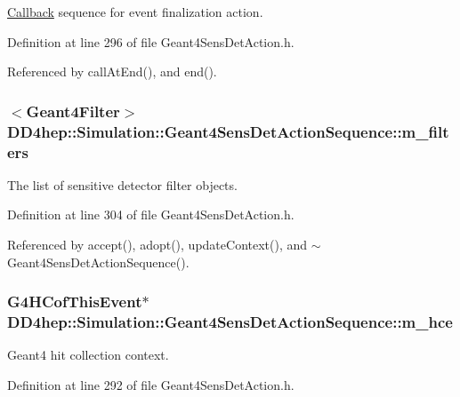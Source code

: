 \hyperlink{class_d_d4hep_1_1_callback}{Callback} sequence for event finalization action. 

Definition at line 296 of file Geant4SensDetAction.h.

Referenced by callAtEnd(), and end().\hypertarget{class_d_d4hep_1_1_simulation_1_1_geant4_sens_det_action_sequence_a67b12a0e51d5249be593f874182155ab}{
\subsubsection[{m\_\-filters}]{$<${\bf Geant4Filter}$>$ {\bf DD4hep::Simulation::Geant4SensDetActionSequence::m\_\-filters}}}
\label{class_d_d4hep_1_1_simulation_1_1_geant4_sens_det_action_sequence_a67b12a0e51d5249be593f874182155ab}


The list of sensitive detector filter objects. 

Definition at line 304 of file Geant4SensDetAction.h.

Referenced by accept(), adopt(), updateContext(), and $\sim$Geant4SensDetActionSequence().\hypertarget{class_d_d4hep_1_1_simulation_1_1_geant4_sens_det_action_sequence_a7a64aa4c2cd4c410962f951bd47d2116}{
\subsubsection[{m\_\-hce}]{\setlength{\rightskip}{0pt plus 5cm}G4HCofThisEvent$\ast$ {\bf DD4hep::Simulation::Geant4SensDetActionSequence::m\_\-hce}}}
\label{class_d_d4hep_1_1_simulation_1_1_geant4_sens_det_action_sequence_a7a64aa4c2cd4c410962f951bd47d2116}


Geant4 hit collection context. 

Definition at line 292 of file Geant4SensDetAction.h.

